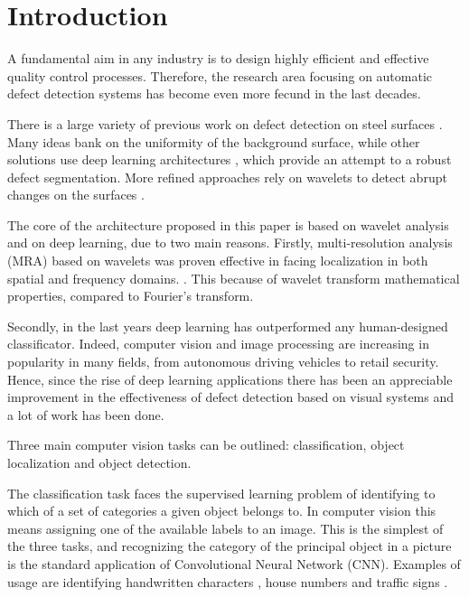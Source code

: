 \section{Introduction}
    \par{
        A fundamental aim in any industry is to design highly efficient and effective quality control processes. Therefore, the research area focusing on automatic defect detection systems has become even more fecund in the last decades. 
    }
    \par{
        There is a large variety of previous work on defect detection on steel surfaces \cite{ieee:4777721, ieee:7030439, ieee:8623728, ieee:1334512, ieee:6738559}. Many ideas \cite{ieee:4777721, ieee:7030439, ieee:8623728} bank on the uniformity of the background surface, while other solutions use deep learning architectures \cite{ieee:1334512, ieee:6738559}, which provide an attempt to a robust defect segmentation. More refined approaches rely on wavelets to detect abrupt changes on the surfaces \cite{ieee:993164, ieee:6703333, ieee:7155940, sciencedirect:NGAN2011442}. 
    }
    \par{
        The core of the architecture proposed in this paper is based on wavelet analysis and on deep learning, due to two main reasons. Firstly, multi-resolution analysis (MRA) based on wavelets was proven effective in facing localization in both spatial and frequency domains. \cite{Vetterli:1995:WSC:201007, Daubechies:1992:TLW:130655, intechopen:bernardini}. This because of wavelet transform mathematical properties, compared to Fourier's transform.
    }
    \par{
        Secondly, in the last years deep learning \cite{Goodfellow:2016:DL:3086952, Rojas:1996:NNS:235222} has outperformed any human-designed classificator. Indeed, computer vision and image processing are increasing in popularity in many fields, from autonomous driving vehicles to retail security. Hence, since the rise of deep learning applications \cite{researchgate:deeplearning} there has been an appreciable improvement in the effectiveness of defect detection based on visual systems and a lot of work has been done.
    }
    \par{
        Three main computer vision tasks can be outlined: classification, object localization and object detection.
    }
    \par{
        The classification task faces the supervised learning problem of identifying to which of a set of categories a given object belongs to. In computer vision this means assigning one of the available labels to an image. This is the simplest of the three tasks, and recognizing the category of the principal object in a picture is the standard application of Convolutional Neural Network (CNN). Examples of usage are identifying handwritten characters \cite{nips:NIPS1989_293, ieee:6248110}, house numbers \cite{ieee:6460867} and traffic signs \cite{ieee:6248110}.

    }
